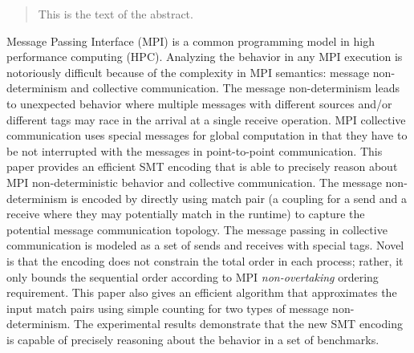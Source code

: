 \begin{abstract}
This is the text of the abstract.
\end{abstract}



Message Passing Interface (MPI) is a common programming model in high performance computing (HPC). 
Analyzing the behavior in any MPI execution is notoriously difficult because of the complexity in MPI semantics: message non-determinism and collective communication. 
The message non-determinism leads to unexpected behavior where multiple messages with different sources and/or different tags may race in the arrival at a single receive operation. 
MPI collective communication uses special messages for global computation in that they have to be not interrupted with the messages in point-to-point communication. 
This paper provides an efficient SMT encoding that is able to precisely reason about MPI non-deterministic behavior and collective communication. The message non-determinism is encoded by directly using match pair (a coupling for a send and a receive where they may potentially match in the runtime) to capture the potential message communication topology. The message passing in collective communication is modeled as a set of sends and receives with special tags. Novel is that the encoding does not constrain the total order in each process; rather, it only bounds the sequential order according to MPI \textit{non-overtaking} ordering requirement. 
This paper also gives an efficient algorithm that approximates the input match pairs using simple counting for two types of message non-determinism. 
The experimental results demonstrate that the new SMT encoding is capable of precisely reasoning about the behavior in a set of benchmarks.